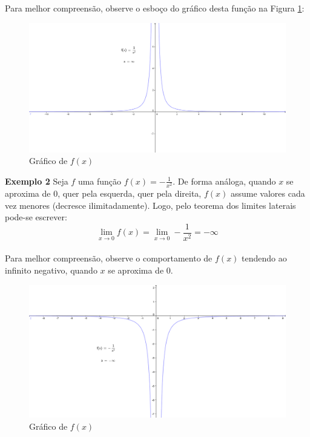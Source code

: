 Para melhor compreensão, observe o esboço do gráfico desta função na Figura \ref{fig:graph3}:\\
\begin{figure}[H]
\centering %
\includegraphics[width=15cm]{img/graph3.png} %
\caption{Gráfico de $f(x)$}
\label{fig:graph3}
\end{figure}

\textbf{Exemplo 2} Seja $f$ uma função $ \displaystyle f(x)=  - \frac{1}{x^2}$. De forma análoga, quando $x$ se aproxima de $0$, quer pela esquerda, quer pela direita, $f(x)$ assume valores cada vez menores (decresce ilimitadamente). Logo, pelo teorema dos limites laterais pode-se escrever:
$$
\lim_{x \to 0} f(x) = \lim_{x \to 0} - \frac{1}{x^2} = - \infty
$$\\

Para melhor compreensão, observe o comportamento de $f(x)$ tendendo ao infinito negativo, quando $x$ se aproxima de $0$.\\
\begin{figure}[H]
\centering %
\includegraphics[width=15cm]{img/graph4.png} %
\caption{Gráfico de $f(x)$}
\label{fig:graph4}
\end{figure}

